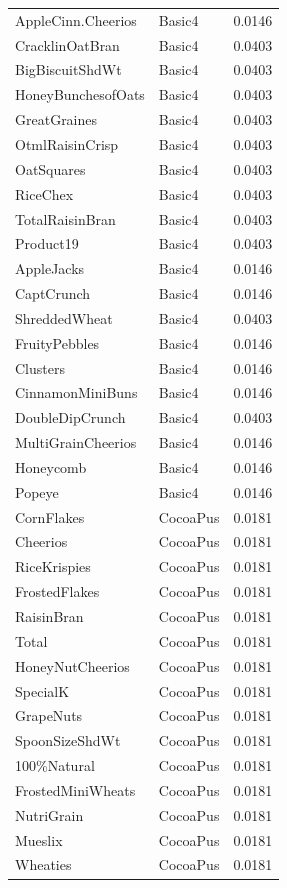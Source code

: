 \begin{table}[!htbp]
\begin{tabular}{lll}
AppleCinn.Cheerios & Basic4 & 0.0146
\\
CracklinOatBran & Basic4 & 0.0403
\\
BigBiscuitShdWt & Basic4 & 0.0403
\\
HoneyBunchesofOats & Basic4 & 0.0403
\\
GreatGraines & Basic4 & 0.0403
\\
OtmlRaisinCrisp & Basic4 & 0.0403
\\
OatSquares & Basic4 & 0.0403
\\
RiceChex & Basic4 & 0.0403
\\
TotalRaisinBran & Basic4 & 0.0403
\\
Product19 & Basic4 & 0.0403
\\
AppleJacks & Basic4 & 0.0146
\\
CaptCrunch & Basic4 & 0.0146
\\
ShreddedWheat & Basic4 & 0.0403
\\
FruityPebbles & Basic4 & 0.0146
\\
Clusters & Basic4 & 0.0146
\\
CinnamonMiniBuns & Basic4 & 0.0146
\\
DoubleDipCrunch & Basic4 & 0.0403
\\
MultiGrainCheerios & Basic4 & 0.0146
\\
Honeycomb & Basic4 & 0.0146
\\
Popeye & Basic4 & 0.0146
\\
CornFlakes & CocoaPus & 0.0181
\\
Cheerios & CocoaPus & 0.0181
\\
RiceKrispies & CocoaPus & 0.0181
\\
FrostedFlakes & CocoaPus & 0.0181
\\
RaisinBran & CocoaPus & 0.0181
\\
Total & CocoaPus & 0.0181
\\
HoneyNutCheerios & CocoaPus & 0.0181
\\
SpecialK & CocoaPus & 0.0181
\\
GrapeNuts & CocoaPus & 0.0181
\\
SpoonSizeShdWt & CocoaPus & 0.0181
\\
100\%Natural & CocoaPus & 0.0181
\\
FrostedMiniWheats & CocoaPus & 0.0181
\\
NutriGrain & CocoaPus & 0.0181
\\
Mueslix & CocoaPus & 0.0181
\\
Wheaties & CocoaPus & 0.0181
\\

\end{tabular}
\end{table}
